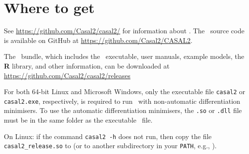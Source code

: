 \section{Where to get \CNAME}\label{sec:installing}

See \url{https://github.com/Casal2/casal2/} for information about \CNAME . The \CNAME\ source code is available on GitHub at \url{https://github.com/Casal2/CASAL2}.

The \CNAME\ bundle, which includes the \CNAME\ executable, user manuals, example models, the \textbf{R} library, and other information, can be downloaded at \url{https://github.com/Casal2/casal2/releases}

For both 64-bit Linux and Microsoft Windows, only the executable file \texttt{casal2} or \texttt{casal2.exe}, respectively, is required to run \CNAME\ with non-automatic differentiation minimisers. To use the automatic differentiation minimisers, the \texttt{.so} or \texttt{.dll} file must be in the same folder as the executable \CNAME\ file.

On Linux:  if the command \texttt{casal2 -h} does not run, then copy the file \texttt{casal2\_release.so} to  (or to another subdirectory in your \texttt{PATH}, e.g., ).


